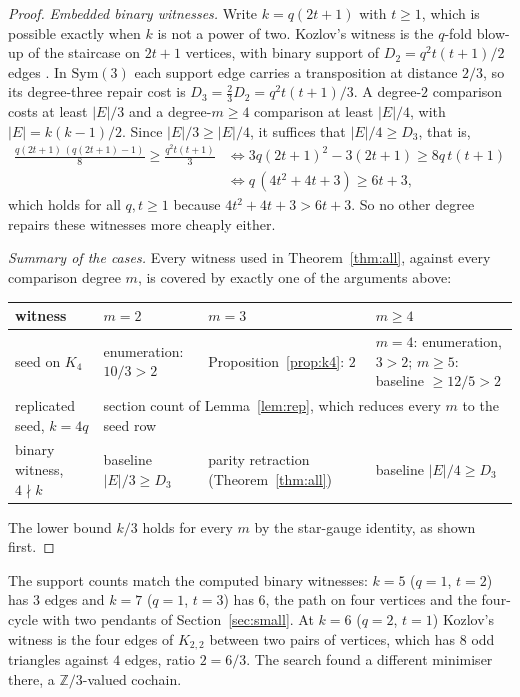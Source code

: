 \documentclass[11pt]{article}
\theoremstyle{remark}\newtheorem{remark}[theorem]{Remark}
\newcommand{\Sym}{\mathrm{Sym}}\newcommand{\dH}{d_H}\newcommand{\F}{\mathbb{F}}\newcommand{\Z}{\mathbb{Z}}
\begin{document}
\begin{proof}
\emph{Embedded binary witnesses.} Write $k=q(2t+1)$ with $t\ge1$, which is possible exactly when $k$ is not a power of two. Kozlov's witness is the $q$-fold blow-up of the staircase on $2t+1$ vertices, with binary support of $D_2=q^2t(t+1)/2$ edges \cite[Thm.~4.2]{Koz}. In $\Sym(3)$ each support edge carries a transposition at distance $2/3$, so its degree-three repair cost is $D_3=\tfrac23D_2=q^2t(t+1)/3$. A degree-$2$ comparison costs at least $|E|/3$ and a degree-$m\ge4$ comparison at least $|E|/4$, with $|E|=k(k-1)/2$. Since $|E|/3\ge|E|/4$, it suffices that $|E|/4\ge D_3$, that is,
\begin{align*}
\frac{q(2t+1)\,(q(2t+1)-1)}{8}\ge\frac{q^2t(t+1)}{3}
&\iff 3q(2t+1)^2-3(2t+1)\ge8q\,t(t+1)\\
&\iff q\,(4t^2+4t+3)\ge6t+3,
\end{align*}
which holds for all $q,t\ge1$ because $4t^2+4t+3>6t+3$. So no other degree repairs these witnesses more cheaply either.

\emph{Summary of the cases.} Every witness used in Theorem~\ref{thm:all}, against every comparison degree $m$, is covered by exactly one of the arguments above:
\begin{center}\footnotesize
\begin{tabular}{p{2.6cm}p{3.0cm}p{3.0cm}p{4.2cm}}\toprule
witness & $m=2$ & $m=3$ & $m\ge4$\\\midrule
seed on $K_4$ & enumeration: $10/3>2$ & Proposition~\ref{prop:k4}: $2$ & $m=4$: enumeration, $3>2$; $m\ge5$: baseline $\ge12/5>2$\\[2pt]
replicated seed, $k=4q$ & \multicolumn{3}{p{10.6cm}}{section count of Lemma~\ref{lem:rep}, which reduces every $m$ to the seed row}\\[2pt]
binary witness, $4\nmid k$ & baseline $|E|/3\ge D_3$ & parity retraction (Theorem~\ref{thm:all}) & baseline $|E|/4\ge D_3$\\\bottomrule
\end{tabular}
\end{center}
The lower bound $k/3$ holds for every $m$ by the star-gauge identity, as shown first.
\end{proof}
The support counts match the computed binary witnesses: $k=5$ ($q=1$, $t=2$) has $3$ edges and $k=7$ ($q=1$, $t=3$) has $6$, the path on four vertices and the four-cycle with two pendants of Section~\ref{sec:small}. At $k=6$ ($q=2$, $t=1$) Kozlov's witness is the four edges of $K_{2,2}$ between two pairs of vertices, which has $8$ odd triangles against $4$ edges, ratio $2=6/3$. The search found a different minimiser there, a $\Z/3$-valued cochain.
\end{document}
